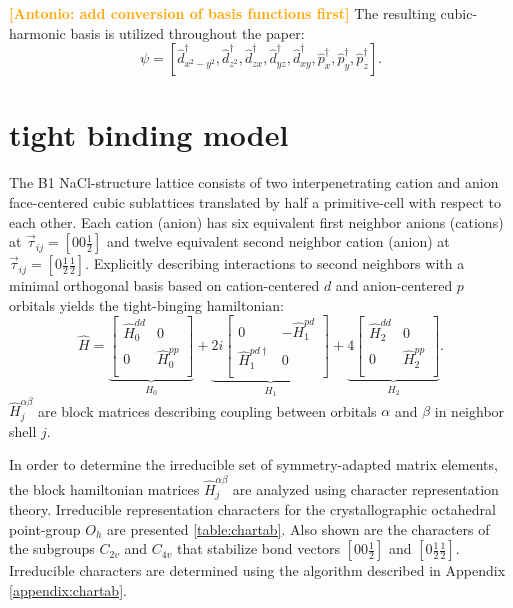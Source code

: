 \documentclass[twocolumn,showpacs,preprintnumbers,superscriptaddress,prb,floatfix,aps,10pt]{revtex4-1}
\newcommand{\abmei}[1]{\textcolor{orange}{ \bf [Antonio: #1] }}
\newcommand*{\ham}{\hat{H}}
\newcommand*{\zeromat}{0}
\begin{document}
\abmei{add conversion of basis functions first}
The resulting cubic-harmonic basis is utilized throughout the paper:
\begin{equation}
\psi = [ \hat{d}_{x^2-y^2}^\dag, \hat{d}_{z^2}^\dag, \hat{d}_{zx}^\dag, \hat{d}_{yz}^\dag, \hat{d}_{xy}^\dag, \hat{p}_{x}^\dag, \hat{p}_{y}^\dag, \hat{p}_{z}^\dag ].
\end{equation}




%
%
\section{tight binding model}
\label{appendix:tb}

The B1 NaCl-structure lattice consists of two interpenetrating cation and anion face-centered cubic sublattices translated by half a primitive-cell with respect to each other. Each cation (anion) has six equivalent first neighbor anions (cations) at $\vec{\tau}_{ij} = [0 0 \frac{1}{2}]$ and twelve equivalent second neighbor cation (anion) at $\vec{\tau}_{ij} = [0 \frac{1}{2} \frac{1}{2}]$. Explicitly describing interactions to second neighbors with a minimal orthogonal basis based on cation-centered $d$ and anion-centered $p$ orbitals yields the tight-binging hamiltonian: 
\begin{equation}
\label{eq:ham_explicit}
\hat{H} = 
\underbrace{
\begin{bmatrix}
\hat{H}_0^{dd} & \zeromat \\
\zeromat & \hat{H}_0^{pp} \\
\end{bmatrix}}_{H_0}
 + 
\underbrace{
 2i
\begin{bmatrix}
\zeromat              & -\hat{H}_1^{pd} \\
\hat{H}_1^{pd\dagger} &  \zeromat        \\
\end{bmatrix}}_{H_1}
 + 
\underbrace{
 4
\begin{bmatrix}
\hat{H}_2^{dd} & \zeromat       \\
\zeromat       & \hat{H}_2^{pp} \\
\end{bmatrix}}_{H_2}.
\end{equation}
$\ham_{j}^{\alpha\beta}$ are block matrices describing coupling between orbitals $\alpha$ and $\beta$ in neighbor shell $j$.

In order to determine the irreducible set of symmetry-adapted matrix elements, the block hamiltonian matrices $\ham_{j}^{\alpha\beta}$ are analyzed using character representation theory. Irreducible representation characters for the crystallographic octahedral point-group $O_h$ are presented \ref{table:chartab}. Also shown are the characters of the subgroups $C_{2v}$ and $C_{4v}$ that stabilize bond vectors $[0 0 \frac{1}{2}]$ and $[0 \frac{1}{2} \frac{1}{2}]$. Irreducible characters are determined using the algorithm described in Appendix \ref{appendix:chartab}.
\end{document}
